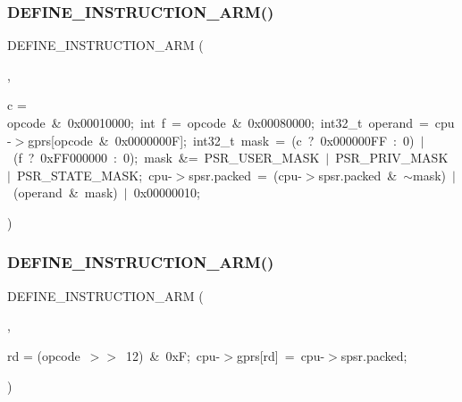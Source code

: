 \mbox{\label{isa-arm_8c_a7d1b909e32bd302d7d01fe19f0ec0f5b}} 
\subsubsection{\texorpdfstring{D\+E\+F\+I\+N\+E\+\_\+\+I\+N\+S\+T\+R\+U\+C\+T\+I\+O\+N\+\_\+\+A\+R\+M()}{DEFINE\_INSTRUCTION\_ARM()}\hspace{0.1cm}{\footnotesize\ttfamily [3/5]}}
{\footnotesize\ttfamily D\+E\+F\+I\+N\+E\+\_\+\+I\+N\+S\+T\+R\+U\+C\+T\+I\+O\+N\+\_\+\+A\+RM (\begin{DoxyParamCaption}\item[{M\+S\+RR}]{,  }\item[{\mbox{\hyperlink{ioapi_8h_a787fa3cf048117ba7123753c1e74fcd6}{int}}}]{c = {\ttfamily opcode~\&~0x00010000;~int~f~=~opcode~\&~0x00080000;~int32\+\_\+t~operand~=~cpu-\/$>$gprs\mbox{[}opcode~\&~0x0000000F\mbox{]};~int32\+\_\+t~mask~=~(c~?~0x000000FF~\+:~0)~$\vert$~(f~?~0xFF000000~\+:~0);~mask~\&=~PSR\+\_\+USER\+\_\+MASK~$\vert$~PSR\+\_\+PRIV\+\_\+MASK~$\vert$~PSR\+\_\+STATE\+\_\+MASK;~cpu-\/$>$spsr.packed~=~(cpu-\/$>$spsr.packed~\&~$\sim$mask)~$\vert$~(operand~\&~mask)~$\vert$~0x00000010;} }\end{DoxyParamCaption})}

\mbox{\label{isa-arm_8c_af003d9bc3a769213adfaaf6966779db0}} 
\subsubsection{\texorpdfstring{D\+E\+F\+I\+N\+E\+\_\+\+I\+N\+S\+T\+R\+U\+C\+T\+I\+O\+N\+\_\+\+A\+R\+M()}{DEFINE\_INSTRUCTION\_ARM()}\hspace{0.1cm}{\footnotesize\ttfamily [4/5]}}
{\footnotesize\ttfamily D\+E\+F\+I\+N\+E\+\_\+\+I\+N\+S\+T\+R\+U\+C\+T\+I\+O\+N\+\_\+\+A\+RM (\begin{DoxyParamCaption}\item[{M\+R\+SR}]{,  }\item[{\mbox{\hyperlink{ioapi_8h_a787fa3cf048117ba7123753c1e74fcd6}{int}}}]{rd = {\ttfamily (opcode~$>$$>$~12)~\&~0xF;~cpu-\/$>$gprs\mbox{[}rd\mbox{]}~=~cpu-\/$>$spsr.packed;} }\end{DoxyParamCaption})}


